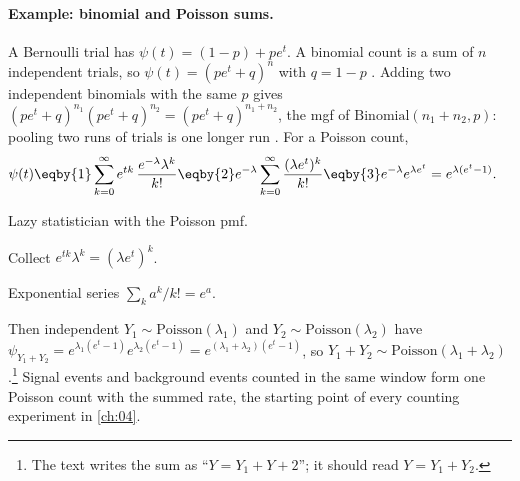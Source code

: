 \paragraph{Example: binomial and Poisson sums.}
A Bernoulli trial has $\psi(t)=(1-p)+pe^t$. A binomial count is a sum of $n$
independent trials, so $\psi(t)=(pe^t+q)^n$ with $q=1-p$
. Adding two independent binomials with the same $p$
gives $(pe^t+q)^{n_1}(pe^t+q)^{n_2}=(pe^t+q)^{n_1+n_2}$, the mgf of
$\mathrm{Binomial}(n_1+n_2,p)$: pooling two runs of trials is one longer run
. For a Poisson count,
\begin{align*}
  \psi(t)
  &\eqby{1} \sum_{k=0}^\infty e^{tk}\,\frac{e^{-\lambda}\lambda^k}{k!}
   \eqby{2} e^{-\lambda}\sum_{k=0}^\infty\frac{(\lambda e^t)^k}{k!}
   \eqby{3} e^{-\lambda}e^{\lambda e^t}
   = e^{\lambda(e^t-1)} .
\end{align*}
\begin{explain}
  \item Lazy statistician with the Poisson pmf.
  \item Collect $e^{tk}\lambda^k=(\lambda e^t)^k$.
  \item Exponential series $\sum_ka^k/k!=e^a$.
\end{explain}
Then independent $Y_1\sim\mathrm{Poisson}(\lambda_1)$ and
$Y_2\sim\mathrm{Poisson}(\lambda_2)$ have
$\psi_{Y_1+Y_2}=e^{\lambda_1(e^t-1)}e^{\lambda_2(e^t-1)}=e^{(\lambda_1+\lambda_2)(e^t-1)}$,
so $Y_1+Y_2\sim\mathrm{Poisson}(\lambda_1+\lambda_2)$
.\footnote{The text writes the sum as
``$Y=Y_1+Y+2$''; it should read $Y=Y_1+Y_2$.} Signal events and background
events counted in the same window form one Poisson count with the summed rate,
the starting point of every counting experiment in \cref{ch:04}.

